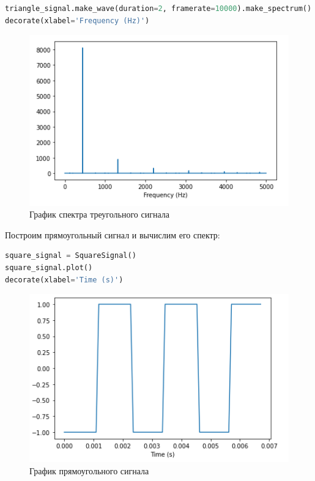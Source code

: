 \begin{lstlisting}[language=Python]
triangle_signal.make_wave(duration=2, framerate=10000).make_spectrum().plot()
decorate(xlabel='Frequency (Hz)')
\end{lstlisting}

\begin{figure}[H]
	\begin{center}
		\includegraphics[scale=1]{fig/lab02/lab02_04.png}
		\caption{График спектра треугольного сигнала}
	\end{center}
\end{figure}

Построим прямоугольный сигнал и вычислим его спектр:

\begin{lstlisting}[language=Python]
square_signal = SquareSignal()
square_signal.plot()
decorate(xlabel='Time (s)')
\end{lstlisting}

\begin{figure}[H]
	\begin{center}
		\includegraphics[scale=1]{fig/lab02/lab02_05.png}
		\caption{График прямоугольного сигнала}
	\end{center}
\end{figure}

